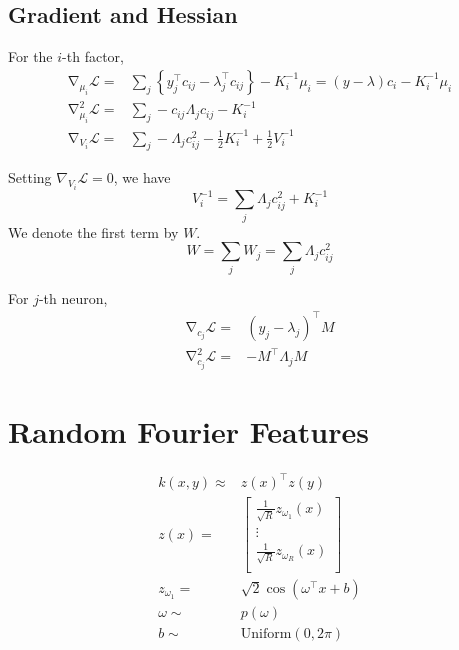 \documentclass{article}
\newcounter{ct}
\DeclareMathOperator{\D}{\nabla}
\begin{document}
    \subsection{Gradient and Hessian}
    For the $i$-th factor, 
    \begin{align}
        \D_{\mu_i} \mathcal{L}  
            =& \sum_j \left\{ y_j^\top c_{ij} - \lambda_j^\top c_{ij}  \right\} - K_i^{-1} \mu_i = (y - \lambda) c_i - K_i^{-1} \mu_i \\
        \D_{\mu_i}^2 \mathcal{L}
            =& \sum_j - c_{ij} \Lambda_j  c_{ij} - K_i^{-1} \\
        \D_{V_i} \mathcal{L} 
            =& \sum_j - \Lambda_j c_{ij}^2 - \frac{1}{2} K_i^{-1} + \frac{1}{2} V_i^{-1} 
    \end{align}

    Setting $\nabla_{V_i} \mathcal{L} = 0$, we have
    \begin{equation}
        V_i^{-1} = \sum_j \Lambda_j c_{ij}^2  + K_i^{-1}
    \end{equation}
    We denote the first term by $W$.
    \begin{equation}
        W = \sum_j W_j = \sum_j \Lambda_j c_{ij}^2
    \end{equation}
    
    For $j$-th neuron,
    \begin{align}
        \D_{c_j} \mathcal{L}  
        =& (y_j - \lambda_j)^\top M \\
        \D_{c_j}^2 \mathcal{L}
        =& - M^\top \Lambda_j M
    \end{align}
    

    \section{Random Fourier Features}
    \begin{align}
        k(x, y) \approx& z(x)^\top z(y) \\
        z(x) =& 
        \begin{bmatrix} 
            \frac{1}{\sqrt{R}} z_{\omega_1}(x) \\
            \vdots \\
            \frac{1}{\sqrt{R}} z_{\omega_R}(x) \\
        \end{bmatrix} \\
        z_{\omega_1} =& \sqrt{2}\cos(\omega^\top x + b) \\
        \omega \sim & p(\omega) \\
        b \sim & \text{Uniform}(0, 2 \pi)
    \end{align}
    
\end{document}
